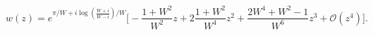\begin{equation}
  w(z) = e^{ \pi/W+i\log \left( \frac{W+i}{W-i}\right)/W} 
\Biggl[
-\frac{1+W^2}{W^2} z+2 \frac{1+W^2}{W^4} z^2 +
\frac{2 W^4+W^2-1}{W^6}z^3+\mathcal{O}(z^4)
\Biggl].
\end{equation}

